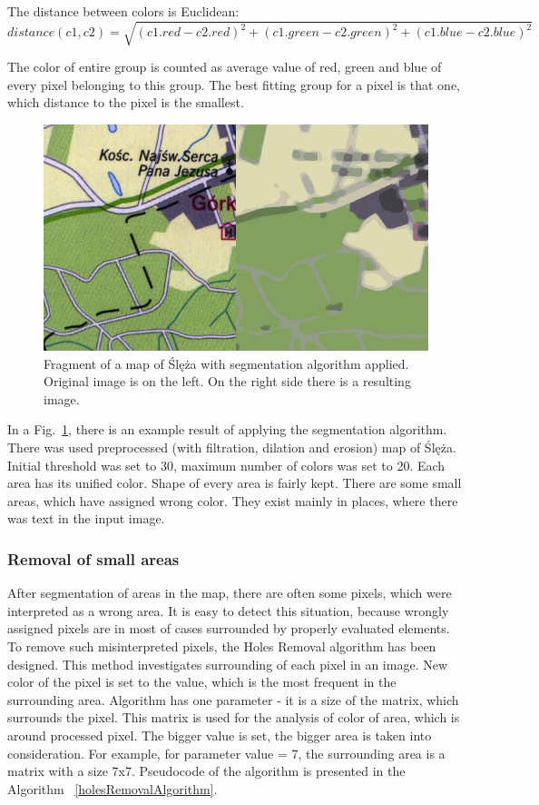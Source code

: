 \documentclass[a4paper,onecolumn,oneside,12pt]{memoir}
\begin{document}
The distance between colors is Euclidean:~
$$
distance(c1, c2) = \sqrt{(c1.red - c2.red)^2 + (c1.green - c2.green)^2 + (c1.blue - c2.blue)^2}
$$

The color of entire group is counted as average value of red, green and blue of every pixel
belonging to this group. The best fitting group for a pixel is that one, which distance to the pixel
is the smallest.

\begin{figure}[!ht]
\begin{center}
\includegraphics[scale=2.5]{images/segmentationResult.png}
\caption{Fragment of a map of Ślęża with segmentation algorithm applied.
Original image is on the left. On the right side there is a resulting image.}
\label{segmentationResult}
\end{center}
\end{figure}

In a Fig.~\ref{segmentationResult}, there is an example result of applying the segmentation
algorithm. There was used preprocessed (with filtration, dilation and erosion) map of Ślęża. Initial
threshold was set to 30, maximum number of colors was set to 20. Each area has its unified color.
Shape of every area is fairly kept. There are some small areas, which have assigned wrong color.
They exist mainly in places, where there was text in the input image.

\subsubsection{Removal of small areas}

After segmentation of areas in the map, there are often some pixels, which were interpreted as a
wrong area. It is easy to detect this situation, because wrongly assigned pixels are in most of
cases surrounded by properly evaluated elements. To remove such misinterpreted pixels, the Holes
Removal algorithm has been designed. This method investigates surrounding of each pixel in an image.
New color of the pixel is set to the value, which is the most frequent in the surrounding area.
Algorithm has one parameter - it is a size of the matrix, which surrounds the pixel. This matrix is
used for the analysis of color of area, which is around processed pixel. The bigger value is set,
the bigger area is taken into consideration. For example, for parameter value = 7, the surrounding
area is a matrix with a size 7x7. Pseudocode of the algorithm is presented in the Algorithm~
\ref{holesRemovalAlgorithm}.
\end{document}
